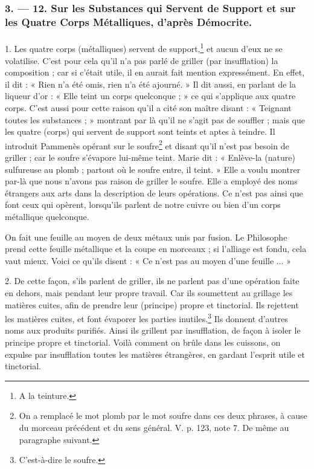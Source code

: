 \documentclass[landscape, a4paper, 11pt, oneside, polutonikogreek, french]{article}
\begin{document}
\bigskip
\centerline{\EightStarTaper}
\centerline{\EightStarTaper\EightStarTaper}
\bigskip

\subsubsection{3. --- 12. Sur les Substances qui Servent de Support et sur les Quatre Corps Métalliques, d'après Démocrite.}
\paragraph{}
1. Les quatre corps (métalliques) servent de support,\footnote{A la teinture.} et aucun d'eux ne se volatilise. C'est pour cela qu'il n'a pas parlé de griller (par insufflation) la composition ; car si c'était utile, il en aurait fait mention expressément. En effet, il dit : « Rien n'a été omis, rien n'a été ajourné. » Il dit aussi, en parlant de la liqueur d'or : « Elle teint un corps quelconque ; » ce qui s'applique aux quatre corps. C'est aussi pour cette raison qu'il a cité son maître disant : « Teignant toutes les substances ; » montrant par là qu'il ne s'agit pas de souffler ; mais que les quatre (corps) qui servent de support sont teints et aptes à teindre. Il introduit Pammenès opérant sur le soufre\footnote{On a remplacé le mot plomb par le mot soufre dans ces deux phrases, à cause du morceau précédent et du sens général. V. p. 123, note 7. De même au paragraphe suivant.} et disant qu'il n'est pas besoin de griller ; car le soufre s'évapore lui-même teint. Marie dit : « Enlève-la (nature) sulfureuse au plomb ; partout où le soufre entre, il teint. » Elle a voulu montrer par-là que nous n'avons pas raison de griller le soufre. Elle a employé des noms étrangers aux arts dans la description de leurs opérations. Ce n'est pas ainsi que font ceux qui opèrent, lorsqu'ils parlent de notre cuivre ou bien d'un corps métallique quelconque.

On fait une feuille au moyen de deux métaux unis par fusion. Le Philosophe prend cette feuille métallique et la coupe en morceaux ; si l'alliage est fondu, cela vaut mieux. Voici ce qu'ils disent : « Ce n'est pas au moyen d'une feuille ... »

2. De cette façon, s'ils parlent de griller, ils ne parlent pas d'une opération faite en dehors, mais pendant leur propre travail. Car ils soumettent au grillage les matières cuites, afin de prendre leur (principe) propre et tinctorial. Ils rejettent les matières cuites, et font évaporer les parties inutiles.\footnote{C'est-à-dire le soufre.} Ils donnent d'autres noms aux produits purifiés. Ainsi ils grillent par insufflation, de façon à isoler le principe propre et tinctorial. Voilà comment on brûle dans les cuissons, on expulse par insufflation toutes les matières étrangères, en gardant l'esprit utile et tinctorial.
\end{document}
